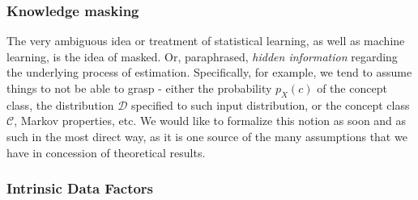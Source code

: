 \documentclass[
  journal=largetwo,
  year=2025,
  volume=37,
]{cup-journal}
\begin{document}
\subsubsection{Knowledge masking}
The very ambiguous idea or treatment of statistical learning, as well as machine learning, is the idea of masked. Or, paraphrased, \textit{hidden information} regarding the underlying process of estimation. Specifically, for example, we tend to assume things to not be able to grasp - either the probability $p_{X}(c)$ of the concept class, the distribution $\mathcal{D}$ specified to such input distribution, or the concept class $\mathcal{C}$, Markov properties, etc. We would like to formalize this notion as soon and as such in the most direct way, as it is one source of the many assumptions that we have in concession of theoretical results. 
\subsubsection{Intrinsic Data Factors}
\end{document}
